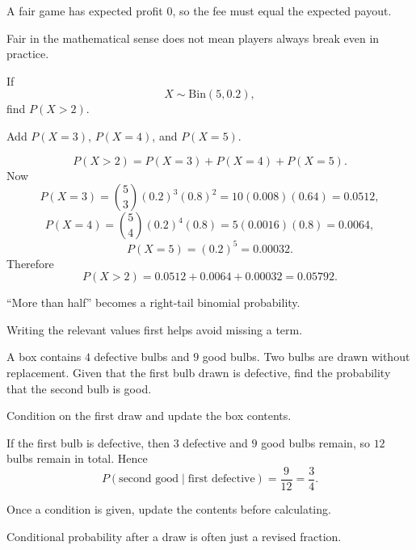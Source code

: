 \begin{takeaways}
\item A fair game has expected profit $0$, so the fee must equal the expected payout.
\item Fair in the mathematical sense does not mean players always break even in practice.
\end{takeaways}

\begin{problem}
If
\[
X\sim \mathrm{Bin}(5,0.2),
\]
find $P(X>2)$.
\end{problem}

\begin{hint}
Add $P(X=3)$, $P(X=4)$, and $P(X=5)$.
\end{hint}

\begin{solution}
\[
P(X>2)=P(X=3)+P(X=4)+P(X=5).
\]
Now
\[
P(X=3)=\binom53(0.2)^3(0.8)^2=10(0.008)(0.64)=0.0512,
\]
\[
P(X=4)=\binom54(0.2)^4(0.8)=5(0.0016)(0.8)=0.0064,
\]
\[
P(X=5)=(0.2)^5=0.00032.
\]
Therefore
\[
P(X>2)=0.0512+0.0064+0.00032=0.05792.
\]
\end{solution}

\begin{takeaways}
\item ``More than half'' becomes a right-tail binomial probability.
\item Writing the relevant values first helps avoid missing a term.
\end{takeaways}

\begin{problem}
A box contains $4$ defective bulbs and $9$ good bulbs. Two bulbs are drawn without replacement. Given that the first bulb drawn is defective, find the probability that the second bulb is good.
\end{problem}

\begin{hint}
Condition on the first draw and update the box contents.
\end{hint}

\begin{solution}
If the first bulb is defective, then $3$ defective and $9$ good bulbs remain, so $12$ bulbs remain in total.
Hence
\[
P(\text{second good}\mid \text{first defective})=\frac9{12}=\frac34.
\]
\end{solution}

\begin{takeaways}
\item Once a condition is given, update the contents before calculating.
\item Conditional probability after a draw is often just a revised fraction.
\end{takeaways}

